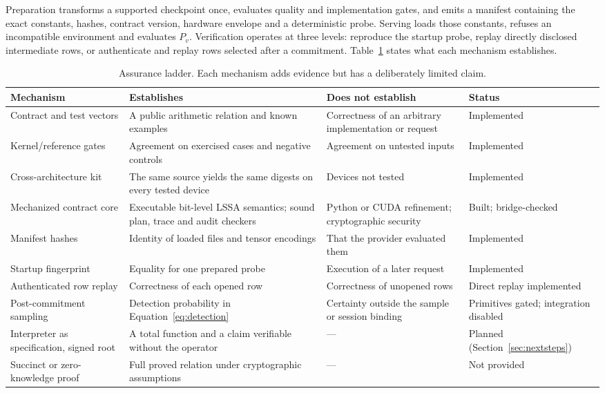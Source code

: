 \documentclass{article}
\begin{document}
Preparation transforms a supported checkpoint once, evaluates quality and implementation
gates, and emits a manifest containing the exact constants, hashes, contract version,
hardware envelope and a deterministic probe.  Serving loads those constants, refuses an
incompatible environment and evaluates $P_v$.  Verification operates at three levels:
reproduce the startup probe, replay directly disclosed intermediate rows, or authenticate and
replay rows selected after a commitment.  Table~\ref{tab:assurance} states what each
mechanism establishes.

\begin{table}[ht]
\centering
\footnotesize
\begin{tabular}{
  >{\raggedright\arraybackslash}p{}
  >{\raggedright\arraybackslash}p{}
  >{\raggedright\arraybackslash}p{}
  >{\raggedright\arraybackslash}p{}}
\toprule
Mechanism & Establishes & Does not establish & Status \\
\midrule
Contract and test vectors & A public arithmetic relation and known examples & Correctness of an arbitrary implementation or request & Implemented \\
\addlinespace[0.30em]
Kernel/reference gates & Agreement on exercised cases and negative controls & Agreement on untested inputs & Implemented \\
\addlinespace[0.30em]
Cross-architecture kit & The same source yields the same digests on every tested device & Devices not tested & Implemented \\
\addlinespace[0.30em]
Mechanized contract core & Executable bit-level LSSA semantics; sound plan, trace and audit checkers & Python or CUDA refinement; cryptographic security & Built; bridge-checked \\
\addlinespace[0.30em]
Manifest hashes & Identity of loaded files and tensor encodings & That the provider evaluated them & Implemented \\
\addlinespace[0.30em]
Startup fingerprint & Equality for one prepared probe & Execution of a later request & Implemented \\
\addlinespace[0.30em]
Authenticated row replay & Correctness of each opened row & Correctness of unopened rows & Direct replay implemented \\
\addlinespace[0.30em]
Post-commitment sampling & Detection probability in Equation~\eqref{eq:detection} & Certainty outside the sample or session binding & Primitives gated; integration disabled \\
\addlinespace[0.30em]
Interpreter as specification, signed root & A total function and a claim verifiable without the operator & --- & Planned (Section~\ref{sec:nextsteps}) \\
\addlinespace[0.30em]
Succinct or zero-knowledge proof & Full proved relation under cryptographic assumptions & --- & Not provided \\
\bottomrule
\end{tabular}
\caption{Assurance ladder.  Each mechanism adds evidence but has a deliberately limited
claim.}
\label{tab:assurance}
\end{table}
\FloatBarrier
\end{document}
